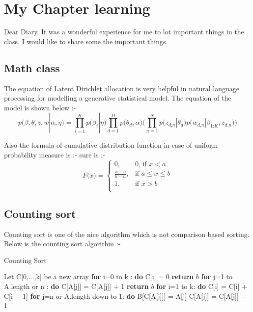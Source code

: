 \chapter{My Chapter learning}

Dear Diary,
It was a wonderful experience for me to lot important things in the class. I would like
to share some the important things.
\section{Math class}
The equation of Latent Dirichlet allocation is very helpful in natural language processing
for modelling a generative statistical model. The equation of the model is shown below
:-
\begin{equation}
{\textit{p}}\big(\beta,\theta,\textit{z},\textit{w} | \alpha ,\eta \big) = \prod_{i=1}^K{\textit{p}}\big(\beta_\textit{i}| \eta\big)  \prod_{d=1}^D{\textit{p}}\big(\theta_\textit{d}, \alpha\big) \big( \prod_{n=1}^N{\textit{p}}\big(\textit{z}_\textit{d,n}| \theta_\textit{d}\big) {\textit{p}}\big(\textit{w}_\textit{d,n}| \beta_\textit{1:K}, \textit{z}_\textit{d,n} \big)\big)
\end{equation}



Also the formula of cumulative distribution function in case of uniform probability measure is :-
sure is :-
\begin{equation}
\textit{F(x)} = \begin{cases}
        0, & \text{0, if $x<a$}\\
        \frac{x-a}{b-a}, & \text{if $a \leq x \leq b$}\\
        1, & \text {if $x>b$}\\
    \end{cases}    
\end{equation}
\clearpage

\section{Counting sort}
Counting sort is one of the nice algorithm which is not comparison based sorting. Below
is the counting sort algorithm :-

\begin{algorithm}
\caption{Counting Sort}\label{alg:euclid}
\begin{algorithmic}[1]
\State Let C[0,...,k] be a new array
\State \textbf{for} i=0 to k : \textbf{do}
\State     C[i] = 0
\State \textbf{return} $b$
\State \textbf{for} j=1 to A.length or n : \textbf{do}
\State    C[A[j]] = C[A[j]] + 1
\State \textbf{return} $b$
\State \textbf{for} i=1 to k: \textbf{do}
\State    C[i] = C[i] + C[i − 1]
\State \textbf{for} j=n or A.length down to 1: \textbf{do}
\State    B[C[A[j]]] = A[j]
\State    C[A[j]] = C[A[j]] − 1

\end{algorithmic}
\end{algorithm}

